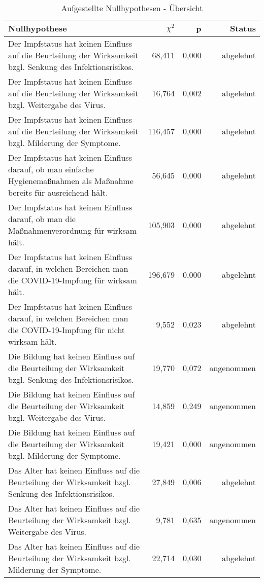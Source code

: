 \begin{table}[h!]
    \centering
    \begin{tabular} {p{9cm} | r | r | r}
        Nullhypothese & $\chi^2$ & p & Status \\
        \hline
        Der Impfstatus hat keinen Einfluss auf die Beurteilung der Wirksamkeit bzgl. Senkung des Infektionsrisikos. & 68,411 & 0,000 & abgelehnt \\
        Der Impfstatus hat keinen Einfluss auf die Beurteilung der Wirksamkeit bzgl. Weitergabe des Virus. & 16,764 & 0,002 & abgelehnt \\
        Der Impfstatus hat keinen Einfluss auf die Beurteilung der Wirksamkeit bzgl. Milderung der Symptome. & 116,457 & 0,000 & abgelehnt \\

        Der Impfstatus hat keinen Einfluss darauf, ob man einfache Hygienemaßnahmen als Maßnahme bereits für ausreichend hält. & 56,645 & 0,000 & abgelehnt \\
        Der Impfstatus hat keinen Einfluss darauf, ob man die Maßnahmenverordnung für wirksam hält. & 105,903 & 0,000 & abgelehnt \\

        Der Impfstatus hat keinen Einfluss darauf, in welchen Bereichen man die COVID-19-Impfung für wirksam hält. & 196,679 & 0,000 & abgelehnt \\
        Der Impfstatus hat keinen Einfluss darauf, in welchen Bereichen man die COVID-19-Impfung für nicht wirksam hält. & 9,552 & 0,023 & abgelehnt \\

        Die Bildung hat keinen Einfluss auf die Beurteilung der Wirksamkeit bzgl. Senkung des Infektionsrisikos. & 19,770 & 0,072 & angenommen \\
        Die Bildung hat keinen Einfluss auf die Beurteilung der Wirksamkeit bzgl. Weitergabe des Virus. & 14,859 & 0,249 & angenommen \\
        Die Bildung hat keinen Einfluss auf die Beurteilung der Wirksamkeit bzgl. Milderung der Symptome. & 19,421 & 0,000 & angenommen \\

        Das Alter hat keinen Einfluss auf die Beurteilung der Wirksamkeit bzgl. Senkung des Infektionsrisikos. & 27,849 & 0,006 & abgelehnt \\
        Das Alter hat keinen Einfluss auf die Beurteilung der Wirksamkeit bzgl. Weitergabe des Virus. & 9,781 & 0,635 & angenommen \\
        Das Alter hat keinen Einfluss auf die Beurteilung der Wirksamkeit bzgl. Milderung der Symptome. & 22,714 & 0,030 & abgelehnt \\

    \end{tabular}
    \caption{Aufgestellte Nullhypothesen - Übersicht}
    \label{tab:hypothesen}
\end{table}
